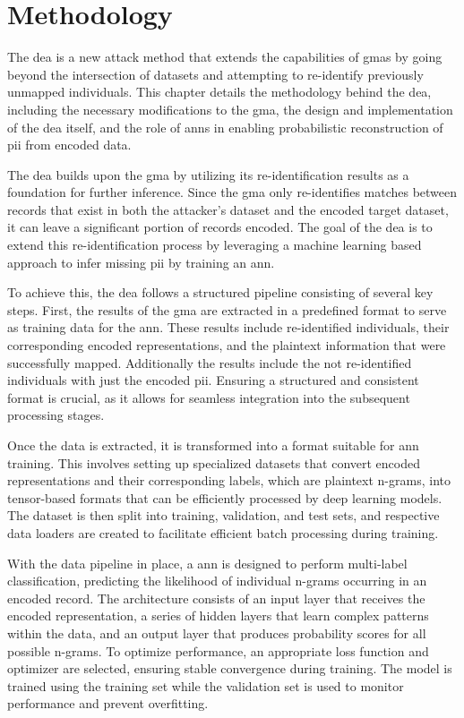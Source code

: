 \chapter{Methodology}  \label{sec:method}
The \ac{dea} is a new attack method that extends the capabilities of \ac{gma}s by going beyond the intersection of datasets and attempting to re-identify previously unmapped individuals.
This chapter details the methodology behind the \ac{dea}, including the necessary modifications to the \ac{gma}, the design and implementation of the \ac{dea} itself, and the role of \ac{ann}s in enabling probabilistic reconstruction of \ac{pii} from encoded data.

The \ac{dea} builds upon the \ac{gma} by utilizing its re-identification results as a foundation for further inference.
Since the \ac{gma} only re-identifies matches between records that exist in both the attacker’s dataset and the encoded target dataset, it can leave a significant portion of records encoded.
The goal of the \ac{dea} is to extend this re-identification process by leveraging a machine learning based approach to infer missing \ac{pii} by training an \ac{ann}.

To achieve this, the \ac{dea} follows a structured pipeline consisting of several key steps.
First, the results of the \ac{gma} are extracted in a predefined format to serve as training data for the \ac{ann}.
These results include re-identified individuals, their corresponding encoded representations, and the plaintext information that were successfully mapped.
Additionally the results include the not re-identified individuals with just the encoded \ac{pii}.
Ensuring a structured and consistent format is crucial, as it allows for seamless integration into the subsequent processing stages.

Once the data is extracted, it is transformed into a format suitable for \ac{ann} training.
This involves setting up specialized datasets that convert encoded representations and their corresponding labels, which are plaintext n-grams, into tensor-based formats that can be efficiently processed by deep learning models.
The dataset is then split into training, validation, and test sets, and respective data loaders are created to facilitate efficient batch processing during training.

With the data pipeline in place, a \ac{ann} is designed to perform multi-label classification, predicting the likelihood of individual n-grams occurring in an encoded record.
The architecture consists of an input layer that receives the encoded representation, a series of hidden layers that learn complex patterns within the data, and an output layer that produces probability scores for all possible n-grams.
To optimize performance, an appropriate loss function and optimizer are selected, ensuring stable convergence during training.
The model is trained using the training set while the validation set is used to monitor performance and prevent overfitting.

